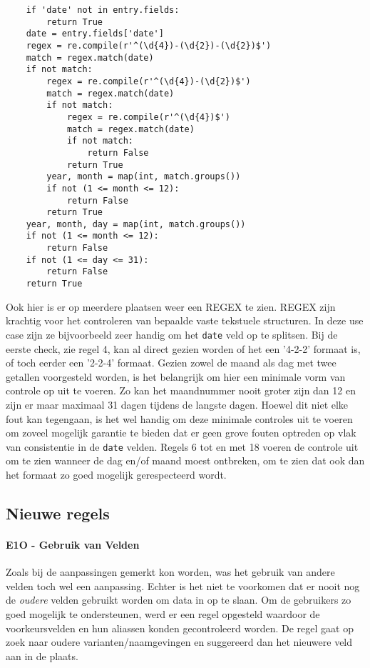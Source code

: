 \begin{verbatim}
    if 'date' not in entry.fields:
        return True
    date = entry.fields['date']
    regex = re.compile(r'^(\d{4})-(\d{2})-(\d{2})$')
    match = regex.match(date)
    if not match:
        regex = re.compile(r'^(\d{4})-(\d{2})$')
        match = regex.match(date)
        if not match:
            regex = re.compile(r'^(\d{4})$')
            match = regex.match(date)
            if not match:
                return False
            return True
        year, month = map(int, match.groups())
        if not (1 <= month <= 12):
            return False
        return True
    year, month, day = map(int, match.groups())
    if not (1 <= month <= 12):
        return False
    if not (1 <= day <= 31):
        return False
    return True
\end{verbatim}
Ook hier is er op meerdere plaatsen weer een \acrfull{REGEX} te zien. \acrshort{REGEX} zijn krachtig voor het controleren van bepaalde vaste tekstuele structuren. In deze use case zijn ze bijvoorbeeld zeer handig om het \texttt{date} veld op te splitsen. Bij de eerste check, zie regel 4, kan al direct gezien worden of het een '4-2-2' formaat is, of toch eerder een '2-2-4' formaat. Gezien zowel de maand als dag met twee getallen voorgesteld worden, is het belangrijk om hier een minimale vorm van controle op uit te voeren. Zo kan het maandnummer nooit groter zijn dan 12 en zijn er maar maximaal 31 dagen tijdens de langste dagen. Hoewel dit niet elke fout kan tegengaan, is het wel handig om deze minimale controles uit te voeren om zoveel mogelijk garantie te bieden dat er geen grove fouten optreden op vlak van consistentie in de \texttt{date} velden. Regels 6 tot en met 18 voeren de controle uit om te zien wanneer de dag en/of maand moest ontbreken, om te zien dat ook dan het formaat zo goed mogelijk gerespecteerd wordt.


\subsection{Nieuwe regels}
\paragraph{E1O - Gebruik van Velden}
\label{rule:E10-field-preferences}
Zoals bij de aanpassingen gemerkt kon worden, was het gebruik van andere velden toch wel een aanpassing. Echter is het niet te voorkomen dat er nooit nog de \emph{oudere} velden gebruikt worden om data in op te slaan. Om de gebruikers zo goed mogelijk te ondersteunen, werd er een regel opgesteld waardoor de voorkeursvelden en hun aliassen konden gecontroleerd worden. De regel gaat op zoek naar oudere varianten/naamgevingen en suggereerd dan het nieuwere veld aan in de plaats. 

